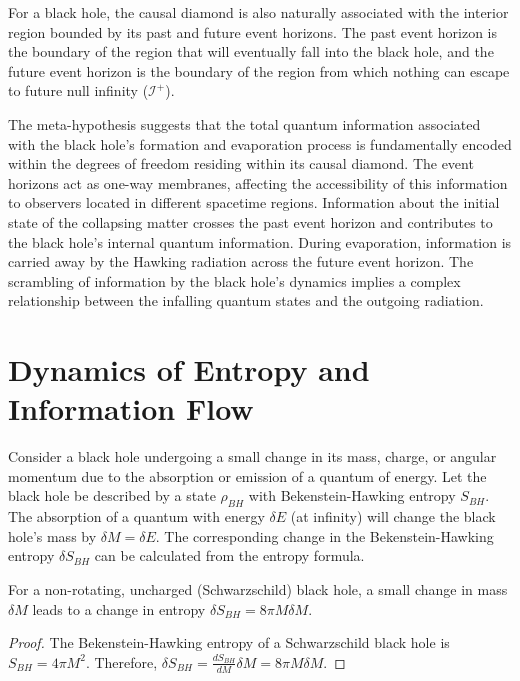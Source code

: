 	For a black hole, the causal diamond is also naturally associated with the interior region bounded by its past and future event horizons. The past event horizon is the boundary of the region that will eventually fall into the black hole, and the future event horizon is the boundary of the region from which nothing can escape to future null infinity ($\mathcal{I}^+$).
	
	The meta-hypothesis suggests that the total quantum information associated with the black hole's formation and evaporation process is fundamentally encoded within the degrees of freedom residing within its causal diamond. The event horizons act as one-way membranes, affecting the accessibility of this information to observers located in different spacetime regions. Information about the initial state of the collapsing matter crosses the past event horizon and contributes to the black hole's internal quantum information. During evaporation, information is carried away by the Hawking radiation across the future event horizon. The scrambling of information by the black hole's dynamics implies a complex relationship between the infalling quantum states and the outgoing radiation.
	
	\section{Dynamics of Entropy and Information Flow}
	
	Consider a black hole undergoing a small change in its mass, charge, or angular momentum due to the absorption or emission of a quantum of energy. Let the black hole be described by a state $\rho_{BH}$ with Bekenstein-Hawking entropy $S_{BH}$. The absorption of a quantum with energy $\delta E$ (at infinity) will change the black hole's mass by $\delta M = \delta E$. The corresponding change in the Bekenstein-Hawking entropy $\delta S_{BH}$ can be calculated from the entropy formula.
	
	\begin{proposition}
		For a non-rotating, uncharged (Schwarzschild) black hole, a small change in mass $\delta M$ leads to a change in entropy $\delta S_{BH} = 8 \pi M \delta M$.
		\begin{proof}
			The Bekenstein-Hawking entropy of a Schwarzschild black hole is $S_{BH} = 4 \pi M^2$. Therefore, $\delta S_{BH} = \frac{d S_{BH}}{d M} \delta M = 8 \pi M \delta M$.
		\end{proof}
	\end{proposition}
	
